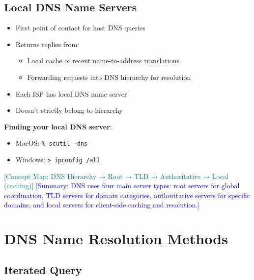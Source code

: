 \documentclass[12pt]{article}
\begin{document}
\subsection{Local DNS Name Servers}
\begin{itemize}
    \item First point of contact for host DNS queries
    \item Returns replies from:
          \begin{itemize}
              \item Local cache of recent name-to-address translations
              \item Forwarding requests into DNS hierarchy for resolution
          \end{itemize}
    \item Each ISP has local DNS name server
    \item Doesn't strictly belong to hierarchy
\end{itemize}

\textbf{Finding your local DNS server}:
\begin{itemize}
    \item MacOS: \texttt{\% scutil --dns}
    \item Windows: \texttt{> ipconfig /all}
\end{itemize}

\textcolor{teal}{[Concept Map: DNS Hierarchy → Root → TLD → Authoritative → Local (caching)]}
\textcolor{blue}{[Summary: DNS uses four main server types: root servers for global coordination, TLD servers for domain categories, authoritative servers for specific domains, and local servers for client-side caching and resolution.]}

\section{DNS Name Resolution Methods}
\subsection{Iterated Query}
\end{document}
